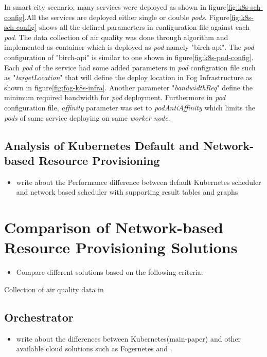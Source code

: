 In smart city scenario, many services were deployed as shown in figure\ref{fig:k8s-sch-config}.All the services are deployed either single or double \emph{pods}. Figure\ref{fig:k8s-sch-config} shows all the defined paramerters in configuration file against each \emph{pod}. The data collection of air quality was done through algorithm and implemented as container which is deployed as \emph{pod} namely "birch-api"\cite{Santos2019}. The \emph{pod} configuration of "birch-api" is similar to one shown in figure\ref{fig:k8s-pod-config}. Each \emph{pod} of the service  had some added parameters in \emph{pod} configration file such as "\emph{targetLocation}" that will define the deploy location in Fog Infrastructure as shown in figure\ref{fig:fog-k8s-infra}. Another parameter "\emph{bandwidthReq}" define the minimum required bandwidth for \emph{pod} deployment. Furthermore in \emph{pod} configuration file, \emph{affinity} parameter was set to \emph{podAntiAffinity} which limits the \emph{pods} of same service deploying on same \emph{worker node}\cite{Santos2019}.
\subsection{Analysis of Kubernetes Default and Network-based Resource Provisioning}
\label{sec:analysis}
\begin{itemize}
  \item write about the Performance difference between default Kubernetes scheduler and network based scheduler with supporting result tables and graphs
\end{itemize}

\section{Comparison of Network-based Resource Provisioning Solutions}
\label{sec:related_work}
\begin{itemize}
  \item Compare different solutions based on the following criteria:
\end{itemize}
Collection of air quality data in
\subsection{Orchestrator}
\label{sec:infra}
\begin{itemize}
  \item write about the differences between Kubernetes(main-paper)\cite{Santos2019} and other available cloud solutions such as Fogernetes\cite{Wobker2018} and \cite{Reale}.
\end{itemize}

